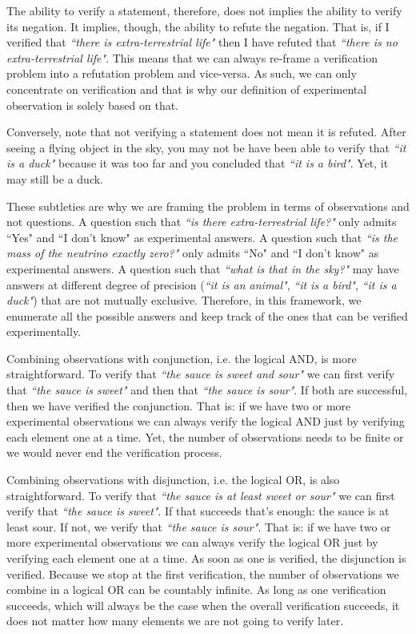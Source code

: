 \documentclass[11pt,letterpaper,fleqn]{memoir} %
\begin{document}
The ability to verify a statement, therefore, does not implies the ability to verify its negation. It implies, though, the ability to refute the negation. That is, if I verified that \emph{``there is extra-terrestrial life"} then I have refuted that \emph{``there is no extra-terrestrial life"}. This means that we can always re-frame a verification problem into a refutation problem and vice-versa. As such, we can only concentrate on verification and that is why our definition of experimental observation is solely based on that.

Conversely, note that not verifying a statement does not mean it is refuted. After seeing a flying object in the sky, you may not be have been able to verify that \emph{``it is a duck"} because it was too far and you concluded that \emph{``it is a bird"}. Yet, it may still be a duck.

These subtleties are why we are framing the problem in terms of observations and not questions. A question such that \emph{``is there extra-terrestrial life?"} only admits ``Yes" and ``I don't know" as experimental answers. A question such that \emph{``is the mass of the neutrino exactly zero?"} only admits ``No" and ``I don't know" as experimental answers. A question such that \emph{``what is that in the sky?"} may have answers at different degree of precision (\emph{``it is an animal"}, \emph{``it is a bird"}, \emph{``it is a duck"}) that are not mutually exclusive. Therefore, in this framework, we enumerate all the possible answers and keep track of the ones that can be verified experimentally.

Combining observations with conjunction, i.e. the logical AND, is more straightforward. To verify that \emph{``the sauce is sweet and sour"} we can first verify that \emph{``the sauce is sweet"} and then that \emph{``the sauce is sour"}. If both are successful, then we have verified the conjunction. That is: if we have two or more experimental observations we can always verify the logical AND just by verifying each element one at a time. Yet, the number of observations needs to be finite or we would never end the verification process.

Combining observations with disjunction, i.e. the logical OR, is also straightforward. To verify that \emph{``the sauce is at least sweet or sour"} we can first verify that \emph{``the sauce is sweet"}. If that succeeds that's enough: the sauce is at least sour. If not, we verify that \emph{``the sauce is sour"}. That is: if we have two or more experimental observations we can always verify the logical OR just by verifying each element one at a time. As soon as one is verified, the disjunction is verified. Because we stop at the first verification, the number of observations we combine in a logical OR can be countably infinite. As long as one verification succeeds, which will always be the case when the overall verification succeeds, it does not matter how many elements we are not going to verify later.
\end{document}
